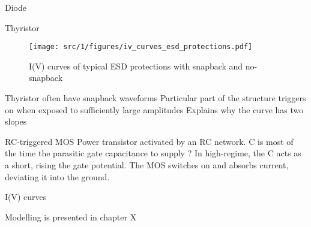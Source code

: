 
Diode


Thyristor

\begin{figure}[!h]
  \centering
  \texttt{[image: src/1/figures/iv\_curves\_esd\_protections.pdf]}
  \caption{I(V) curves of typical ESD protections with snapback and no-snapback}
  \label{fig:iv-curve-esd-protection}
\end{figure}

Thyristor often have snapback waveforms
Particular part of the structure triggers on when exposed to sufficiently large amplitudes
Explains why the curve has two slopes

RC-triggered MOS
Power transistor activated by an RC network.
C is most of the time the parasitic gate capacitance to supply ?
In high-regime, the C acts as a short, rising the gate potential.
The MOS switches on and absorbs current, deviating it into the ground.

I(V) curves



Modelling is presented in chapter X
